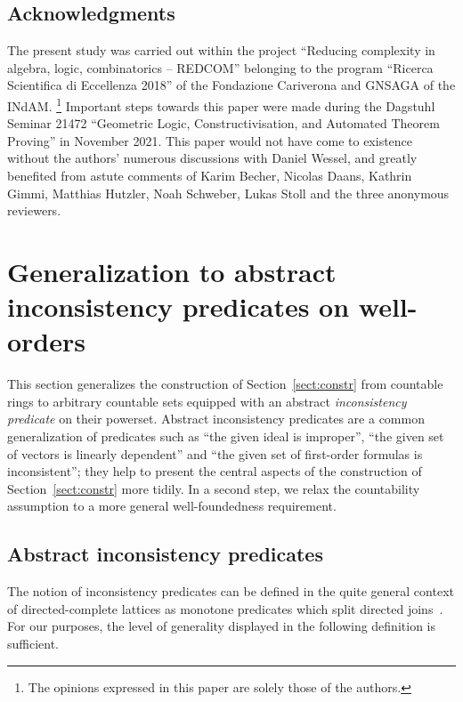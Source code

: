 \documentclass[com,11pt,crcready]{iosart2x}
\theoremstyle{definition}
\theoremstyle{plain}
\theoremstyle{remark}
\renewcommand{\_}{\mathpunct{.}\,}
\begin{document}
\color{black}

\subsection{Acknowledgments}
The present study was carried out within the project ``Reducing complexity in
algebra, logic, combinatorics -- REDCOM'' belonging to the program ``Ricerca
Scientifica di Eccellenza 2018'' of the Fondazione Cariverona and GNSAGA of the INdAM.%
\footnote{The opinions expressed in this paper are solely those of the
authors.} Important steps towards this paper were made
during the Dagstuhl Seminar 21472 ``Geometric Logic, Constructivisation, and
Automated Theorem Proving'' in November 2021. This paper would not have come to
existence without the authors' numerous discussions with Daniel Wessel, and
greatly benefited from astute comments of Karim Becher, Nicolas Daans, Kathrin Gimmi, Matthias Hutzler,
Noah Schweber, Lukas Stoll and the three anonymous reviewers.


\appendix


\section{Generalization to abstract inconsistency predicates on well-orders}
\label{sect:inc-wf}

This section generalizes the construction of Section~\ref{sect:constr} from
countable rings to arbitrary countable sets equipped with an abstract
\emph{inconsistency predicate} on their powerset. Abstract inconsistency
predicates are a common generalization of predicates such as ``the given ideal is
improper'', ``the given set of vectors is linearly dependent'' and ``the given
set of first-order formulas is inconsistent''; they help to present the
central aspects of the construction of Section~\ref{sect:constr} more tidily.
In a second step, we relax the countability assumption to a more general
well-foundedness requirement.


\subsection{Abstract inconsistency predicates}

The notion of inconsistency predicates can be defined in the quite general
context of directed-complete lattices as monotone predicates which split
directed joins~\cite{schuster-wessel:jacincpred}. For our purposes, the level of generality displayed in the
following definition is sufficient.
\end{document}
